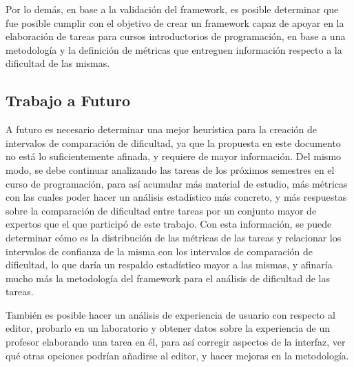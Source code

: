 \documentclass[letterpaper,12pt]{article}
\begin{document}
Por lo demás, en base a la validación del framework, es posible determinar que fue posible cumplir con el objetivo de crear un framework capaz de apoyar en la elaboración de tareas para cursos introductorios de programación, en base a una metodología y la definición de métricas que entreguen información respecto a la dificultad de las mismas.

\subsection{Trabajo a Futuro}

A futuro es necesario determinar una mejor heurística para la creación de intervalos de comparación de dificultad, ya que la propuesta en este documento no está lo suficientemente afinada, y requiere de mayor información. Del mismo modo, se debe continuar analizando las tareas de los próximos semestres en el curso de programación, para así acumular más material de estudio, más métricas con las cuales poder hacer un análisis estadístico más concreto, y más respuestas sobre la comparación de dificultad entre tareas por un conjunto mayor de expertos que el que participó de este trabajo. Con esta información, se puede determinar cómo es la distribución de las métricas de las tareas y relacionar los intervalos de confianza de la misma con los intervalos de comparación de dificultad, lo que daría un respaldo estadístico mayor a las mismas, y afinaría mucho más la metodología del framework para el análisis de dificultad de las tareas.

También es posible hacer un análisis de experiencia de usuario con respecto al editor, probarlo en un laboratorio y obtener datos sobre la experiencia de un profesor elaborando una tarea en él, para así corregir aspectos de la interfaz, ver qué otras opciones podrían añadirse al editor, y hacer mejoras en la metodología.

\newpage

{}
\end{document}
